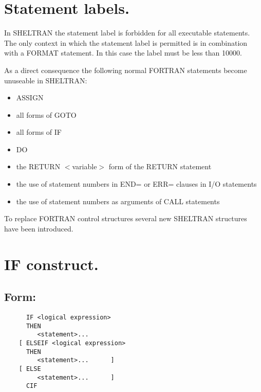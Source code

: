 \section{Statement labels.}

In SHELTRAN the statement label is forbidden for all executable
statements.  The only context in which the statement label is permitted
is in combination with a FORMAT statement.  In this case the label must
be less than 10000. 

As a direct consequence the following normal FORTRAN statements become
unuseable in SHELTRAN:

\begin{itemize}

\item ASSIGN

\item all forms of GOTO

\item all forms of IF

\item DO

\item the RETURN $<$variable$>$ form of the RETURN statement

\item the use of statement numbers in END= or ERR= clauses in I/O
statements

\item the use of statement numbers as arguments of CALL statements

\end{itemize}

To replace FORTRAN control structures several new SHELTRAN structures
have been introduced. 

\section{IF construct.}
\subsection{Form:}
\begin{verbatim}
      IF <logical expression>
      THEN
         <statement>... 
    [ ELSEIF <logical expression>
      THEN
         <statement>...      ] 
    [ ELSE
         <statement>...      ] 
      CIF 
\end{verbatim}
